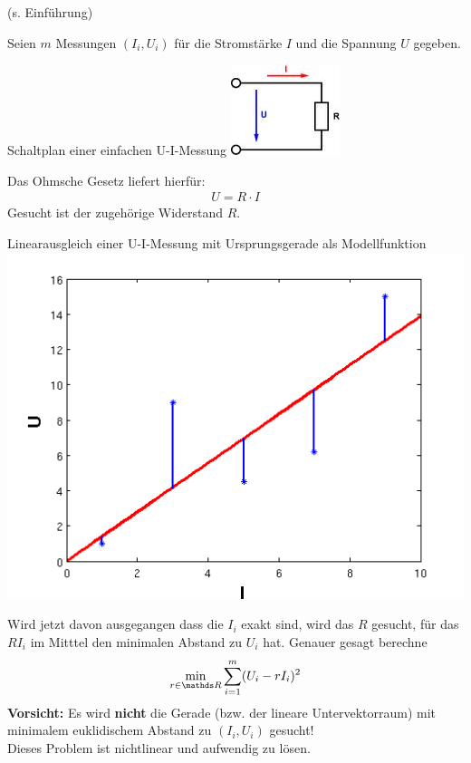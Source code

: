 \begin{Bspe}
  (s. Einführung)
  
  Seien $m$ Messungen $(I_i, U_i)$ für die Stromstärke $I$ und die Spannung $U$ gegeben. \\
  
  \begin{image}{Schaltplan einer einfachen U-I-Messung}
    \includegraphics{images/ohmsche.jpeg}
  \end{image}
  
  Das Ohmsche Gesetz liefert hierfür:
  \begin{gather*}
    U=R\cdot I
  \end{gather*}
  Gesucht ist der zugehörige Widerstand $R$.\\
  
  \begin{image}{Linearausgleich einer U-I-Messung mit Ursprungsgerade als Modellfunktion}
    \includegraphics[width=0.5\linewidth]{images/linausgl2.png}
  \end{image}
  
  Wird jetzt davon ausgegangen dass die $I_i$ exakt sind, wird das $R$ gesucht, 
  für das $RI_i$ im Mitttel den minimalen Abstand zu $U_i$ hat.
  Genauer gesagt berechne
  \begin{gather*}
    \min_{r\in\R} \sum_{i=1}^{m}(U_i-rI_i)^2
  \end{gather*}
  \textbf{Vorsicht: } Es wird \textbf{nicht} die Gerade (bzw. der lineare Untervektorraum) mit 
  minimalem euklidischem Abstand zu $(I_i,U_i)$ gesucht! \\
  Dieses Problem ist nichtlinear und aufwendig zu lösen.
\end{Bspe}


